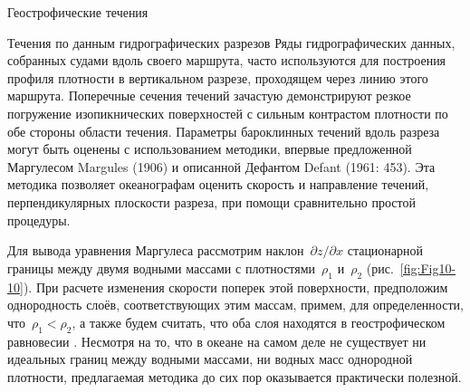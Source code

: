 \begin{chapter}{Геострофические течения}
\begin{section}{Течения по данным гидрографических разрезов}
%
Ряды гидрографических данных, собранных судами вдоль своего маршрута,
часто используются для построения профиля плотности в вертикальном разрезе,
проходящем через линию этого маршрута. Поперечные сечения течений
зачастую демонстрируют резкое погружение изопикнических
поверхностей с сильным контрастом плотности по обе стороны области
течения. Параметры бароклинных течений вдоль разреза могут быть
оценены с использованием методики, впервые предложенной Маргулесом Margules (1906)
и описанной Дефантом Defant (1961: 453). Эта методика позволяет
океанографам оценить скорость и направление течений, перпендикулярных
плоскости разреза, при помощи сравнительно простой процедуры.
%

Для вывода уравнения Маргулеса рассмотрим наклон~$\partial z/\partial x$ 
стационарной границы между двумя водными массами с плотностями~$\rho_1$ 
и~$\rho_2$ (рис.~\ref{fig:Fig10-10}). При
расчете изменения скорости поперек этой поверхности, предположим
однородность слоёв, соответствующих этим массам, примем, для
определенности, что~$\rho_1 < \rho_2$, а также будем считать, что оба слоя 
находятся в геострофическом равновесии%
. 
Несмотря на то, что в океане на самом деле не существует ни идеальных границ
между водными массами, ни водных масс однородной плотности,
предлагаемая методика до сих пор оказывается практически полезной.
%


\end{section}
\end{chapter}
